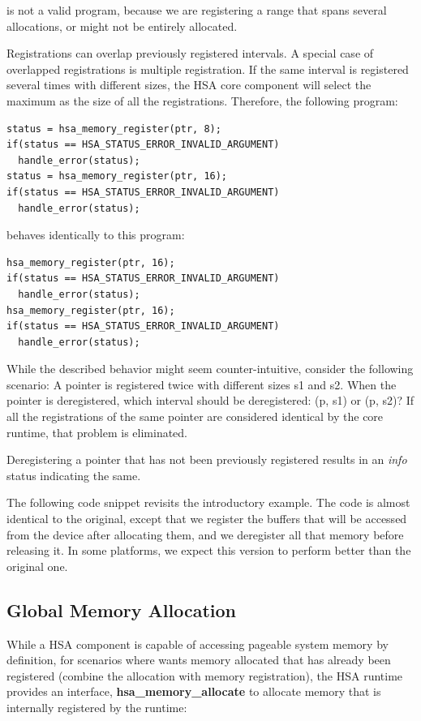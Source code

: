 \documentclass[final]{book}
\newcommand{\reffun}[1]{\textbf{#1}}
\begin{document}
is not a valid program, because we are registering a range that spans several
allocations, or might not be entirely allocated.

Registrations can overlap previously registered intervals. A special case of
overlapped registrations is multiple registration. If the same interval is
registered several times with different sizes, the HSA core component will
select the maximum as the size of all the registrations. Therefore, the
following program:

\begin{lstlisting}
status = hsa_memory_register(ptr, 8);
if(status == HSA_STATUS_ERROR_INVALID_ARGUMENT)
  handle_error(status);
status = hsa_memory_register(ptr, 16);
if(status == HSA_STATUS_ERROR_INVALID_ARGUMENT)
  handle_error(status);
\end{lstlisting}

behaves identically to this program:

\begin{lstlisting}
hsa_memory_register(ptr, 16);
if(status == HSA_STATUS_ERROR_INVALID_ARGUMENT)
  handle_error(status);
hsa_memory_register(ptr, 16);
if(status == HSA_STATUS_ERROR_INVALID_ARGUMENT)
  handle_error(status);
\end{lstlisting}

While the described behavior might seem counter-intuitive, consider the
following scenario: A pointer is registered twice with different sizes s1 and
s2. When the pointer is deregistered, which interval should be deregistered: (p,
s1) or (p, s2)? If all the registrations of the same pointer are considered
identical by the core runtime, that problem is eliminated.

Deregistering a pointer that has not been previously registered results in an
\emph{info} status indicating the same.

The following code snippet revisits the introductory example. The code is almost
identical to the original, except that we register the buffers that will be
accessed from the device after allocating them, and we deregister all that
memory before releasing it. In some platforms, we expect this version to perform
better than the original one.


\hypertarget{globalmemory}{}\subsection{Global  Memory Allocation}\label{globalmemory}

While a HSA component is capable of accessing pageable system memory by
definition, for scenarios where wants memory allocated that has already been
registered (combine the allocation with memory registration), the HSA runtime
provides an interface, \reffun{hsa_memory_allocate} to allocate memory that is
internally registered by the runtime:
\end{document}
